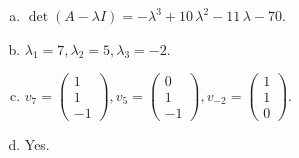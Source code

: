 \begin{questions}
\begin{solution}
\begin{enumerate}[(a)]
\item $\det(A-\lambda I)=-{\lambda}^{3} + 10 \, {\lambda}^{2} - 11 \, {\lambda} - 70$.
\item ${\lambda}_1=7, {\lambda}_2=5, {\lambda}_3=-2$.
\item $v_{7}=\left(\begin{array}{r}
1 \\
1 \\
-1
\end{array}\right), v_{5}=\left(\begin{array}{r}
0 \\
1 \\
-1
\end{array}\right), v_{-2}=\left(\begin{array}{r}
1 \\
1 \\
0
\end{array}\right)$.
\item Yes.
\end{enumerate}
\end{solution}

\end{questions}

\newpage


\begin{center}
\end{center}


